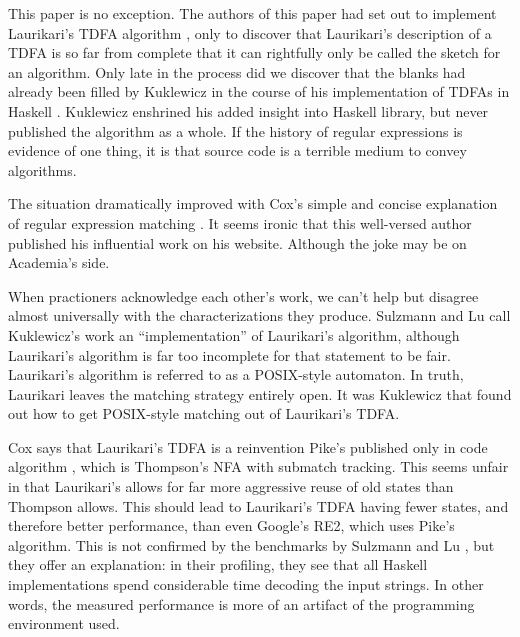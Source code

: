 \documentclass[english]{sigplanconf}
\theoremstyle{definition}
\newcommand{\ra}{$\rightarrow$}
\newcommand{\del}[1]{\textcolor{red}{\sout{#1}}} %
\newcommand{\chg}[2]{\textcolor{red}{\sout{#1}}{\ra}\textcolor{blue}{\uline{#2}}} %
\newcommand{\del}[1]{} %
\newcommand{\chg}[2]{#2}
\renewcommand{\del}[1]{} %
\renewcommand{\chg}[2]{#2} %
\newcommand\on[1]{\nbc{ON}{#1}{red}} %
\begin{document}
This paper is no exception. The authors of this paper had set out
to implement Laurikari's TDFA algorithm \cite{Lauri00a},
\on{MISSING REF}
only to discover that Laurikari's description of a TDFA is so far
from complete that it can rightfully only be called the sketch for
an algorithm. Only late in the process did we discover that the blanks
had already been filled by Kuklewicz in the course of his implementation
of TDFAs in Haskell \cite{Kukl07a}. Kuklewicz enshrined his
added insight into Haskell library, but never published the algorithm
as a whole. If the history of regular expressions is evidence of one
thing, it is that source code is a terrible medium to convey algorithms. 

The situation dramatically improved with Cox's simple and concise
explanation of regular expression matching \cite{Cox07a}. It seems
ironic that this well-versed author published his influential work
on his website. Although the joke may be on Academia's side.

When \del{the taciturn} practioners acknowledge each other's work, we can't
help but disagree almost universally with the characterizations they
produce. Sulzmann and Lu \cite{Sulz12a} call Kuklewicz's
work an ``implementation'' of Laurikari's algorithm, although Laurikari's
algorithm is far too incomplete for that statement to be fair. Laurikari's
algorithm is referred to as a POSIX-style automaton. In truth, Laurikari
leaves the matching strategy entirely open. It was Kuklewicz that
found out how to get POSIX-style matching out of Laurikari's TDFA. 

Cox says that Laurikari's TDFA is a reinvention Pike's published only
in code algorithm \cite{Pike87a}, which is Thompson's NFA with submatch
tracking. This seems unfair in that Laurikari's allows for far more
aggressive \chg{reusing}{reuse} of old states than \del{what} Thompson allows. This should
lead to Laurikari's TDFA having fewer states, and therefore better
performance, than even Google's RE2, which uses Pike's algorithm.
This is not confirmed by the benchmarks by Sulzmann and Lu \cite{Sulz12a},
but they offer an explanation: in their profiling, they see that all
Haskell implementations spend considerable time decoding the input
strings. In other words, the measured performance is more of an artifact
of the programming environment used. 
\end{document}
